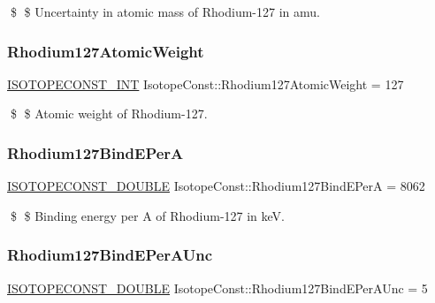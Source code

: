 \$ \$ Uncertainty in atomic mass of Rhodium-\/127 in amu. \mbox{\label{group___isotope_const-_rhodium-_rh127_ga9309c2eec67401cfbd3e9166f7a1125f}} 
\subsubsection{\texorpdfstring{Rhodium127\+Atomic\+Weight}{Rhodium127AtomicWeight}}
{\footnotesize\ttfamily \mbox{\hyperlink{group___isotope_const-_macros_ga5f18360b3e99483a35c32d789e62621c}{I\+S\+O\+T\+O\+P\+E\+C\+O\+N\+S\+T\+\_\+\+I\+NT}} Isotope\+Const\+::\+Rhodium127\+Atomic\+Weight = 127}

\$ \$ Atomic weight of Rhodium-\/127. \mbox{\label{group___isotope_const-_rhodium-_rh127_gabd158875c72a47ea8f563fd0fffaab51}} 
\subsubsection{\texorpdfstring{Rhodium127\+Bind\+E\+PerA}{Rhodium127BindEPerA}}
{\footnotesize\ttfamily \mbox{\hyperlink{group___isotope_const-_macros_ga8f45a7272ce02c0b4c65c44636ed719a}{I\+S\+O\+T\+O\+P\+E\+C\+O\+N\+S\+T\+\_\+\+D\+O\+U\+B\+LE}} Isotope\+Const\+::\+Rhodium127\+Bind\+E\+PerA = 8062}

\$ \$ Binding energy per A of Rhodium-\/127 in keV. \mbox{\label{group___isotope_const-_rhodium-_rh127_gafbef107669e2116a234f469b1490f0cf}} 
\subsubsection{\texorpdfstring{Rhodium127\+Bind\+E\+Per\+A\+Unc}{Rhodium127BindEPerAUnc}}
{\footnotesize\ttfamily \mbox{\hyperlink{group___isotope_const-_macros_ga8f45a7272ce02c0b4c65c44636ed719a}{I\+S\+O\+T\+O\+P\+E\+C\+O\+N\+S\+T\+\_\+\+D\+O\+U\+B\+LE}} Isotope\+Const\+::\+Rhodium127\+Bind\+E\+Per\+A\+Unc = 5}

